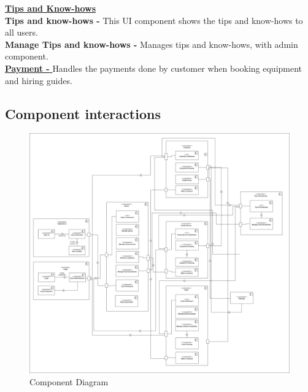 \underline{\textbf{Tips and Know-hows}}\\
\textbf{Tips and know-hows - }This UI component shows the tips and know-hows to all users.\\
\textbf{Manage Tips and know-hows - }Manages tips and know-hows, with admin component.\\

\underline{\textbf{Payment - }}Handles the payments done by customer when booking equipment and hiring guides.\\



\subsection{Component interactions}

\begin{figure}[h!]
    \centering
    \includegraphics[width=1\textwidth]{Images/component.drawio.png}
    \caption{Component Diagram}
    \label{fig:enter-label}
\end{figure}
\clearpage